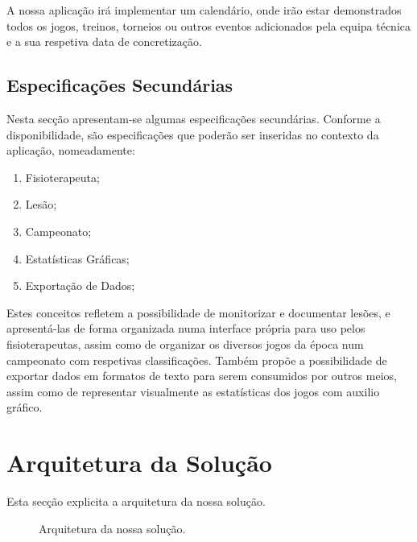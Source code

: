 A nossa aplicação irá implementar um calendário, onde irão estar demonstrados todos os jogos, treinos, torneios ou outros eventos adicionados pela equipa técnica e a sua respetiva data de concretização.



\subsection{Especificações Secundárias} \label{sec222}
 Nesta secção apresentam-se algumas especificações secundárias. Conforme a disponibilidade, são especificações que poderão ser inseridas no contexto da aplicação, nomeadamente:
\begin{enumerate}
	\item Fisioterapeuta;
	\item Lesão;
	\item Campeonato;
	\item Estatísticas Gráficas;
	\item Exportação de Dados;
\end{enumerate}

Estes conceitos refletem a possibilidade de monitorizar e documentar lesões, e apresentá-las de forma organizada numa interface própria para uso pelos fisioterapeutas, assim como de organizar os diversos jogos da época num campeonato com respetivas classificações. Também propõe a possibilidade de exportar dados em formatos de texto para serem consumidos por outros meios, assim como de representar visualmente as estatísticas dos jogos com auxilio gráfico.

\section{Arquitetura da Solução}\label{sec23}
Esta secção explicita a arquitetura da nossa solução.

\begin{figure}[h]
	\begin{center}
	\end{center}
	\caption{Arquitetura da nossa solução.}\label{fig:arquitetura}
\end{figure}

